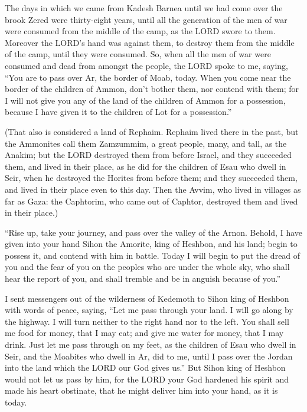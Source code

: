  The days in which we came from Kadesh Barnea until we
had come over the brook Zered were thirty-eight years, until all the
generation of the men of war were consumed from the middle of the camp,
as the LORD swore to them.  Moreover the LORD's hand was
against them, to destroy them from the middle of the camp, until they
were consumed.  So, when all the men of war were consumed
and dead from amongst the people,  the LORD spoke to me,
saying,  ``You are to pass over Ar, the border of Moab,
today.  When you come near the border of the children of
Ammon, don't bother them, nor contend with them; for I will not give you
any of the land of the children of Ammon for a possession, because I
have given it to the children of Lot for a possession.''

 (That also is considered a land of Rephaim. Rephaim
lived there in the past, but the Ammonites call them Zamzummim,
 a great people, many, and tall, as the Anakim; but the
LORD destroyed them from before Israel, and they succeeded them, and
lived in their place,  as he did for the children of Esau
who dwell in Seir, when he destroyed the Horites from before them; and
they succeeded them, and lived in their place even to this day.
 Then the Avvim, who lived in villages as far as Gaza:
the Caphtorim, who came out of Caphtor, destroyed them and lived in
their place.)

 ``Rise up, take your journey, and pass over the valley
of the Arnon. Behold, I have given into your hand Sihon the Amorite,
king of Heshbon, and his land; begin to possess it, and contend with him
in battle.  Today I will begin to put the dread of you
and the fear of you on the peoples who are under the whole sky, who
shall hear the report of you, and shall tremble and be in anguish
because of you.''

 I sent messengers out of the wilderness of Kedemoth to
Sihon king of Heshbon with words of peace, saying,  ``Let
me pass through your land. I will go along by the highway. I will turn
neither to the right hand nor to the left.  You shall
sell me food for money, that I may eat; and give me water for money,
that I may drink. Just let me pass through on my feet, 
as the children of Esau who dwell in Seir, and the Moabites who dwell in
Ar, did to me, until I pass over the Jordan into the land which the LORD
our God gives us.''  But Sihon king of Heshbon would not
let us pass by him, for the LORD your God hardened his spirit and made
his heart obstinate, that he might deliver him into your hand, as it is
today.

